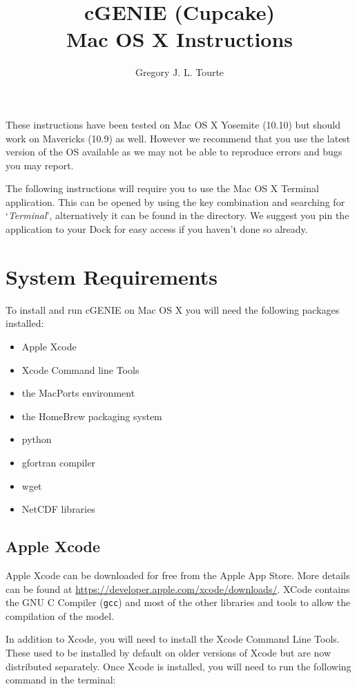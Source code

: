 \documentclass{scrartcl}
\title{cGENIE (Cupcake)\\
Mac OS X Instructions}
\author{Gregory J. L. Tourte}
\begin{document}
\maketitle

These instructions have been tested on Mac OS X Yosemite (10.10) but should
work on Mavericks (10.9) as well. However we recommend that you use the latest
version of the OS available as we may not be able to reproduce errors and bugs
you may report.

The following instructions will require you to use the Mac OS X Terminal
application. This can be opened by using the \keys{\cmd+\SPACE} key combination
and searching for `\textit{Terminal}', alternatively it can be found in the
 directory. We suggest you pin
the application to your Dock for easy access if you haven't done so already.

\section{System Requirements}

To install and run cGENIE on Mac OS X you will need the following packages
installed:

\begin{itemize}
	\item Apple Xcode
	\item Xcode Command line Tools
	\item the MacPorts environment
	\item the HomeBrew packaging system 
	\item python
	\item gfortran compiler 
	\item wget
	\item NetCDF libraries
\end{itemize}

\subsection{Apple Xcode}

Apple Xcode can be downloaded for free from the Apple App Store. More details
can be found at \url{https://developer.apple.com/xcode/downloads/}. XCode
contains the GNU C Compiler (\texttt{gcc}) and most of the other libraries and
tools to allow the compilation of the model.

In addition to Xcode, you will need to install the Xcode Command Line Tools.
These used to be installed by default on older versions of Xcode but are now
distributed separately. Once Xcode is installed, you will need to run the
following command in the terminal:
\end{document}
